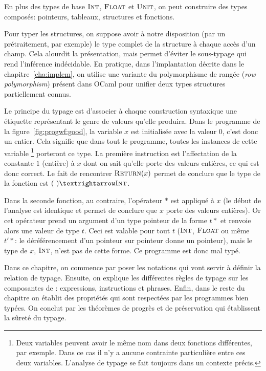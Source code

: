 En plus des types de base $\textsc{Int}$, $\textsc{Float}$ et $\textsc{Unit}$, on peut construire des
types composés: pointeurs, tableaux, structures et fonctions.

Pour typer les structures, on suppose avoir à notre disposition (par un
prétraitement, par exemple) le type complet de la structure à chaque accès d'un
champ. Cela alourdit la présentation, mais permet d'éviter le sous-typage qui
rend l'inférence indécidable. En pratique, dans l'implantation décrite dans le
chapitre~\ref{cha:implem}, on utilise une variante du polymorphisme de rangée
(\emph{row polymorphism}) présent dans OCaml pour unifier deux types structures
partiellement connus.

Le principe du typage est d'associer à chaque construction syntaxique une
étiquette représentant le genre de valeurs qu'elle produira. Dans le programme
de la figure~\ref{fig:progwf:good}, la variable $x$ est initialisée avec la
valeur $0$, c'est donc un entier. Cela signifie que dans tout le programme,
toutes les instances de cette variable
\footnote{Deux variables peuvent avoir le même nom dans deux fonctions
  différentes, par exemple. Dans ce cas il n'y a aucune contrainte particulière
  entre ces deux variables. L'analyse de typage se fait toujours dans un
  contexte précis.
}
porteront ce type. La première instruction est l'affectation de la constante $1$
(entière) à $x$ dont on sait qu'elle porte des valeurs entières, ce qui est donc
correct. Le fait de rencontrer $\textsc{Return}(x)$ permet de conclure que le type de
la fonction est $(~) → \tInt$.

Dans la seconde fonction, au contraire, l'opérateur $*$ est appliqué à $x$ (le
début de l'analyse est identique et permet de conclure que $x$ porte des valeurs
entières). Or cet opérateur prend un argument d'un type pointeur de la forme
$t*$ et renvoie alors une valeur de type $t$. Ceci est valable pour tout $t$
($\textsc{Int}$, $\textsc{Float}$ ou même $t'*$: le déréférencement d'un pointeur sur pointeur
donne un pointeur), mais le type de $x$, $\textsc{Int}$, n'est pas de cette forme. Ce
programme est donc mal typé.

Dans ce chapitre, on commence par poser les notations qui vont servir à définir
la relation de typage. Ensuite, on explique les différentes règles de typage sur
les composantes de \langname: expressions, instructions et phrases. Enfin, dans
le reste du chapitre on établit des propriétés qui sont respectées par les
programmes bien typées. On conclut par les théorèmes de progrès et de
préservation qui établissent la sûreté du typage.

